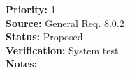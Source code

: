 \begin{reqlist}
{\bf Priority:} 1 \\
{\bf Source:} General Req. 8.0.2 \\
{\bf Status:} Proposed \\
{\bf Verification:} System test\\
{\bf Notes:} 
\end{reqlist}

% 




















